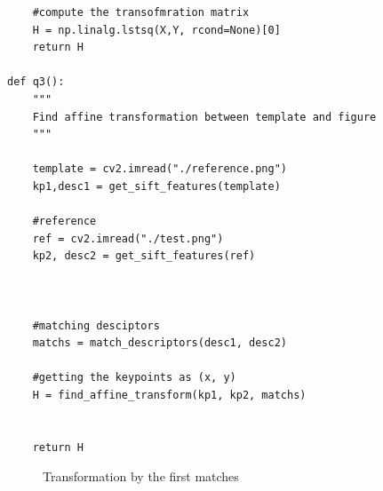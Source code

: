 \documentclass[12pt]{article}
\begin{document}
\begin{enumerate}[label=(\alph*)]
\begin{verbatim}
    #compute the transofmration matrix
    H = np.linalg.lstsq(X,Y, rcond=None)[0]
    return H

def q3():
    """
    Find affine transformation between template and figure
    """

    template = cv2.imread("./reference.png")
    kp1,desc1 = get_sift_features(template) 

    #reference
    ref = cv2.imread("./test.png")
    kp2, desc2 = get_sift_features(ref)



    #matching desciptors
    matchs = match_descriptors(desc1, desc2)

    #getting the keypoints as (x, y)
    H = find_affine_transform(kp1, kp2, matchs)


    return H
\end{verbatim}

 \begin{figure}[ht]
   \centering
   \hfill
   \caption{Transformation by the first matches}
 \end{figure}


\end{enumerate}
\end{document}
